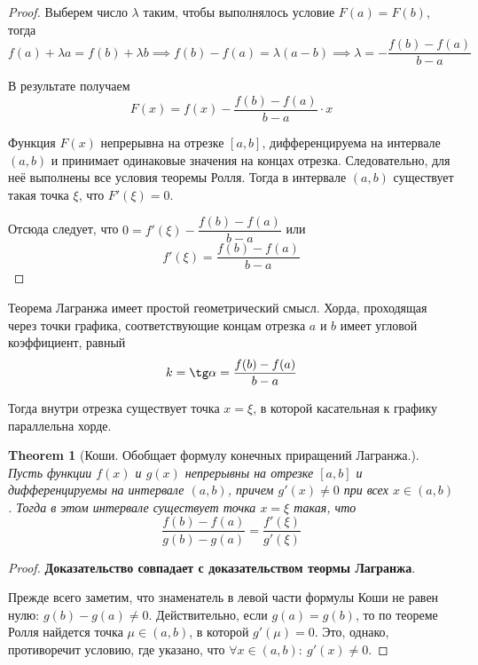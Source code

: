 \documentclass[a4paper]{article}
\theoremstyle{named}
\newtheorem*{namedtheorem}{Theorem}
\begin{document}
\begin{colloq}
\begin{proof}
			Выберем число $\lambda$ таким, чтобы выполнялось условие $F(a) = F(b)$, тогда
			\begin{equation*}
				f(a) + \lambda a = f(b) + \lambda b 
				\implies f(b) - f(a) = \lambda(a - b) 
				\implies \lambda = -\dfrac{f(b) - f(a)}{b - a}
			\end{equation*}

			В результате получаем
			\begin{equation*}
				F(x) = f(x) - \dfrac{f(b) - f(a)}{b - a} \cdot x
			\end{equation*}

			Функция $F(x)$ непрерывна на отрезке $[a, b]$, дифференцируема на интервале $(a, b)$ и принимает одинаковые значения на концах отрезка. Следовательно, для неё выполнены все условия теоремы Ролля. Тогда в интервале $(a, b)$ существует такая точка $\xi$, что $F'(\xi) = 0$.

			Отсюда следует, что $0 = f'(\xi) - \dfrac{f(b) - f(a)}{b - a}$ или
			\begin{equation*}
				f'(\xi) = \dfrac{f(b) - f(a)}{b - a}
			\end{equation*}
		\end{proof}

		Теорема Лагранжа имеет простой геометрический смысл. Хорда, проходящая через точки графика, соответствующие концам отрезка $a$ и $b$ имеет угловой коэффициент, равный
		\begin{equation*}
			k = \tg \alpha = \dfrac{f(b) - f(a)}{b - a}
		\end{equation*}

		Тогда внутри отрезка существует точка $x = \xi$, в которой касательная к графику параллельна хорде.

		\begin{namedtheorem}[Коши. Обобщает формулу конечных приращений Лагранжа.]
			Пусть функции $f(x)$ и $g(x)$ непрерывны на отрезке $[a, b]$ и дифференцируемы на интервале $(a, b)$, причем $g'(x) \neq 0$ при всех $x \in (a, b)$. Тогда в этом интервале существует точка $x = \xi$ такая, что
			\begin{equation*}
				\dfrac{f(b) - f(a)}{g(b) - g(a)} = \dfrac{f'(\xi)}{g'(\xi)}
			\end{equation*}
		\end{namedtheorem}

		\begin{proof}
			\textbf{Доказательство совпадает с доказательством теормы Лагранжа}.


			Прежде всего заметим, что знаменатель в левой части формулы Коши не равен нулю: $g(b) - g(a) \neq 0$. Действительно, если $g(a) = g(b)$, то по теореме Ролля найдется точка $\mu \in (a, b)$, в которой $g'(\mu) = 0$. Это, однако, противоречит условию, где указано, что $\forall x \in (a, b): \ g'(x) \neq 0$.


\end{proof}
\end{colloq}
\end{document}

